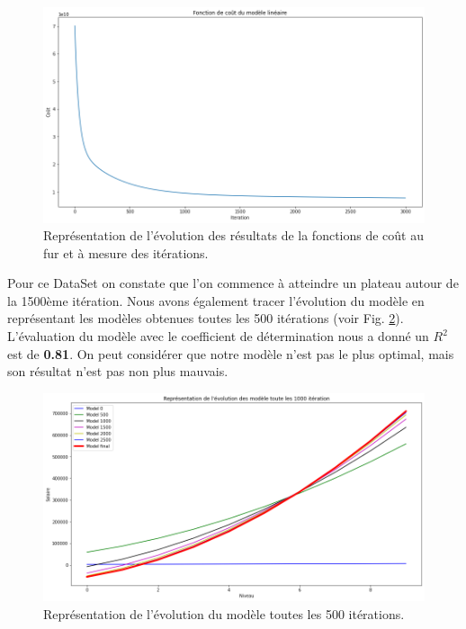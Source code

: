 \documentclass[french]{article}
\begin{document}
\begin{figure}[!htbp]
    \centering
    \includegraphics[width=\textwidth]{Rapport/images/cout_MLP.png}
    \caption{Représentation de l'évolution des résultats de la fonctions de coût au fur et à mesure des itérations.}
    \label{fig:cout_MLP}
\end{figure}

Pour ce DataSet on constate que l'on commence à atteindre un plateau autour de la 1500ème itération. Nous avons également tracer l'évolution du modèle en représentant les modèles obtenues toutes les 500 itérations (voir Fig. \ref{fig:evo_MLP}). L'évaluation du modèle avec le coefficient de détermination nous a donné un $R^{2}$ est de \textbf{0.81}. On peut considérer que notre modèle n'est pas le plus optimal, mais son résultat n'est pas non plus mauvais.

\begin{figure}[!htbp]
    \centering
    \includegraphics[width=\textwidth]{Rapport/images/evo_MLP.png}
    \caption{Représentation de l'évolution du modèle toutes les 500 itérations.}
    \label{fig:evo_MLP}
\end{figure}
\end{document}
